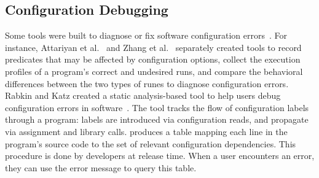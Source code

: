 

  \vspace{-.5em}
\subsection{Configuration Debugging}
Some tools were built to diagnose or fix software configuration errors~\cite{Attariyan:2008:UCD,Attariyan:2010:ACT,Rabkin:2011:PPC,Zhang:2013:ADS,Weiss:2017:TIS,Oh2021}. 
For instance, Attariyan et al.~\cite{Attariyan:2008:UCD} and Zhang et al.~\cite{Zhang:2013:ADS} separately created tools to record predicates that may be affected by configuration options, collect the execution profiles of a program's correct and undesired runs, and compare the behavioral differences between the two types of runes to diagnose configuration errors. 
Rabkin and Katz created a static analysis-based tool to help users debug configuration errors in software~\cite{Rabkin:2011:PPC}. 
The tool tracks the flow of configuration labels through a program: labels are introduced via configuration reads, and propagate via assignment and library calls. %
\tool produces a table mapping each line in the program's source code to the set of relevant configuration dependencies. This procedure is done by developers at release time. When a user encounters an error, they can use the error message to query this table. 
 

